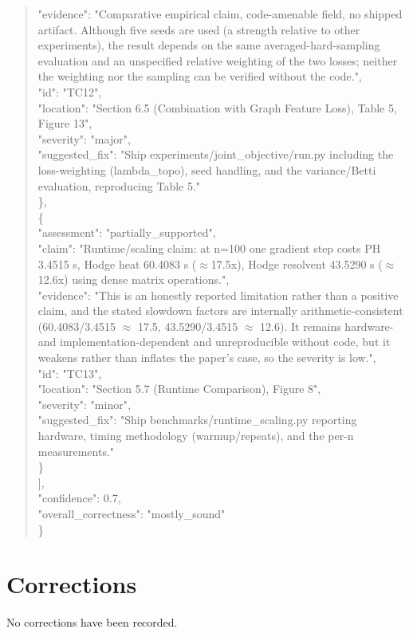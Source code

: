 \documentclass[11pt]{article}
\begin{document}
\begin{quote}
      "evidence": "Comparative empirical claim, code-amenable field, no shipped artifact. Although five seeds are used (a strength relative to other experiments), the result depends on the same averaged-hard-sampling evaluation and an unspecified relative weighting of the two losses; neither the weighting nor the sampling can be verified without the code.",\\
      "id": "TC12",\\
      "location": "Section 6.5 (Combination with Graph Feature Loss), Table 5, Figure 13",\\
      "severity": "major",\\
      "suggested\_fix": "Ship experiments/joint\_objective/run.py including the loss-weighting (lambda\_topo), seed handling, and the variance/Betti evaluation, reproducing Table 5."\\
    \},\\
    \{\\
      "assessment": "partially\_supported",\\
      "claim": "Runtime/scaling claim: at n=100 one gradient step costs PH 3.4515 s, Hodge heat 60.4083 s (\ensuremath{\approx}17.5x), Hodge resolvent 43.5290 s (\ensuremath{\approx}12.6x) using dense matrix operations.",\\
      "evidence": "This is an honestly reported limitation rather than a positive claim, and the stated slowdown factors are internally arithmetic-consistent (60.4083/3.4515 \ensuremath{\approx} 17.5, 43.5290/3.4515 \ensuremath{\approx} 12.6). It remains hardware- and implementation-dependent and unreproducible without code, but it weakens rather than inflates the paper's case, so the severity is low.",\\
      "id": "TC13",\\
      "location": "Section 5.7 (Runtime Comparison), Figure 8",\\
      "severity": "minor",\\
      "suggested\_fix": "Ship benchmarks/runtime\_scaling.py reporting hardware, timing methodology (warmup/repeats), and the per-n measurements."\\
    \}\\
  ],\\
  "confidence": 0.7,\\
  "overall\_correctness": "mostly\_sound"\\
\}\\
\end{quote}

\section*{Corrections}
No corrections have been recorded.
\end{document}
